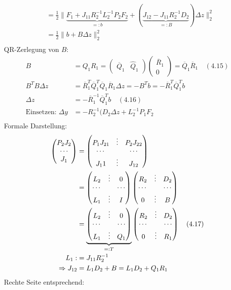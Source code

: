 \begin{itemize}
\begin{align*}
&= \frac 12 \|\underbrace{F_1 + J_{11} R_2^{-1} L_2^{-1} P_2 F_2}_{=: b} + (\underbrace{J_{12} - J_{11} R_2^{-1} D_2}_{=\colon B}) \Delta z \|_2^2\\
&= \frac 12 \|b + B \Delta z \|_2^2 \\
\end{align*}
QR-Zerlegung von $B$:
\begin{align*}
B &= Q_1 R_1 = \begin{pmatrix} \overline Q_1 & \hat Q_1 \end{pmatrix} \begin{pmatrix} \overline R_1 \\ 0 \end{pmatrix} = \overline Q_1 \overline R_1 \quad (4.15) \\
B^T B \Delta z &= \overline R_1^T \overline Q_1^T \overline Q_1 \overline R_1 \Delta z = -B^T b = -\overline R_1^T \overline Q_1^T b \\
\Delta z &= - \overline R_1^{-1} \overline Q_1^T b \quad (4.16)\\
\text{Einsetzen: } \Delta y &= -R_2^{-1} ( D_2 \Delta z + L_2^{-1} P_1 F_2 \\
\end{align*}
Formale Darstellung:
\begin{align*}
\begin{pmatrix} P_2 J_2 \\ \cdots \\ J_1 \end{pmatrix} &= \begin{pmatrix} P_1 J_{21} & \vdots & P_2 J_{22} \\ \cdots & & \cdots \\ J_11 & \vdots & J_{12} \end{pmatrix} \\
&= \begin{pmatrix} L_2 & \vdots & 0 \\ \cdots & & \cdots \\ L_1 & \vdots & I \end{pmatrix} \begin{pmatrix} R_2 & \vdots & D_2 \\ \cdots & & \cdots \\ 0 & \vdots & B \end{pmatrix} \\
&= \underbrace{ \begin{pmatrix} L_2 & \vdots & 0 \\ \cdots && \cdots \\ L_1 & \vdots & Q_1 \end{pmatrix}}_{=: T} \begin{pmatrix} R_2 & \vdots & D_2 \\ \cdots && \cdots \\ 0 & \vdots & R_1 \end{pmatrix} \quad (4.17) \\
L_1 :&= J_{11} R_2^{-1} \\
\Rightarrow J_{12} &= L_1 D_2 + B = L_1 D_2 + Q_1 R_1 \\
\end{align*}
Rechte Seite entsprechend:

\end{itemize}
